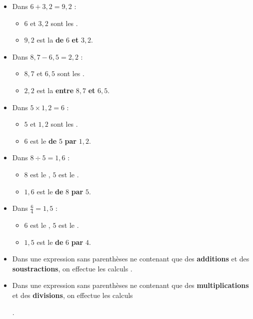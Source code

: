 \documentclass[../€Cours-complet/Cours-complet]{subfiles}
\begin{document}
\begin{exemple}
	\begin{itemize}
		\item Dans $6 + 3,2 = 9,2$ :
		      \begin{itemize}
			      \item $6$ et $3,2$ sont les .
			      \item $9,2$ est la  \textbf{de} $6$ \textbf{et} $3,2$.
		      \end{itemize}
		\item Dans $8,7 - 6,5 = 2,2$ :
		      \begin{itemize}
			      \item $8,7$ et $6,5$ sont les .
			      \item $2,2$ est la  \textbf{entre} $8,7$ \textbf{et} $6,5$.
		      \end{itemize}
		\item Dans $5 × 1,2 = 6$ :
		      \begin{itemize}
			      \item $5$ et $1,2$ sont les .
			      \item $6$ est le  \textbf{de} $5$ \textbf{par} $1,2$.
		      \end{itemize}
		\item Dans $8 ÷ 5 = 1,6$ :
		      \begin{itemize}
			      \item $8$ est le , $5$ est le .
			      \item $1,6$ est le  \textbf{de} $8$ \textbf{par} $5$.
		      \end{itemize}
		\item Dans $\frac{6}{4} = 1,5$ :
		      \begin{itemize}
			      \item $6$ est le , $5$ est le .
			      \item $1,5$ est le  \textbf{de} $6$ \textbf{par} $4$.
		      \end{itemize}
	\end{itemize}
\end{exemple}

\begin{cours}
	\begin{itemize}
		\item Dans une expression sans parenthèses ne contenant que des \textbf{additions} et des \textbf{soustractions}, on effectue les calculs  .
		\item Dans une expression sans parenthèses ne contenant que des \textbf{multiplications} et des \textbf{divisions}, on effectue les calculs 

		      .
	\end{itemize}
\end{cours}
\end{document}
